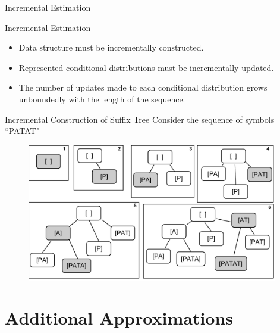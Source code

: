 \documentclass{beamer}
\begin{document}
\begin{frame}[t]{Incremental Estimation}
	\begin{block}{Incremental Estimation}
		\begin{itemize}
			\item Data structure must be incrementally constructed.
			\item Represented conditional distributions must be incrementally updated.
			\item The number of updates made to each conditional distribution grows unboundedly with the length of the sequence.
		\end{itemize}
	\end{block}
\end{frame}

\begin{frame}[t]{Incremental Construction of Suffix Tree \cite{Gasthaus2010}}
	Consider the sequence of symbols ``PATAT"
	\begin{figure}[t]
		\begin{center}
			\includegraphics[height = 6cm]{../figs/PATAT.pdf}
		\end{center}
	\end{figure}
\end{frame}

\section{Additional Approximations}
\subsection{}
\end{document}
